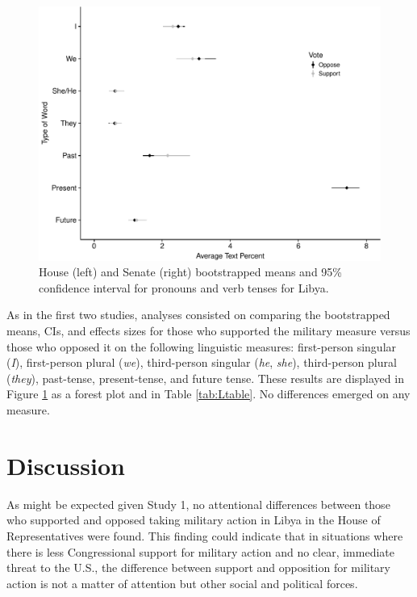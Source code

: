 \documentclass[english,man]{apa6}
\theoremstyle{definition}
\theoremstyle{definition}
\theoremstyle{definition}
\theoremstyle{remark}
\begin{document}
\begin{figure}
\centering
\includegraphics{Language_of_War_Markdown_files/figure-latex/Lpic-1.pdf}
\caption{\label{fig:Lpic}House (left) and Senate (right) bootstrapped means
and 95\% confidence interval for pronouns and verb tenses for Libya.}
\end{figure}

As in the first two studies, analyses consisted on comparing the
bootstrapped means, CIs, and effects sizes for those who supported the
military measure versus those who opposed it on the following linguistic
measures: first-person singular (\emph{I}), first-person plural
(\emph{we}), third-person singular (\emph{he}, \emph{she}), third-person
plural (\emph{they}), past-tense, present-tense, and future tense. These
results are displayed in Figure \ref{fig:Lpic} as a forest plot and in
Table \ref{tab:Ltable}. No differences emerged on any measure.

\section{Discussion}\label{discussion-2}

As might be expected given Study 1, no attentional differences between
those who supported and opposed taking military action in Libya in the
House of Representatives were found. This finding could indicate that in
situations where there is less Congressional support for military action
and no clear, immediate threat to the U.S., the difference between
support and opposition for military action is not a matter of attention
but other social and political forces.
\end{document}
